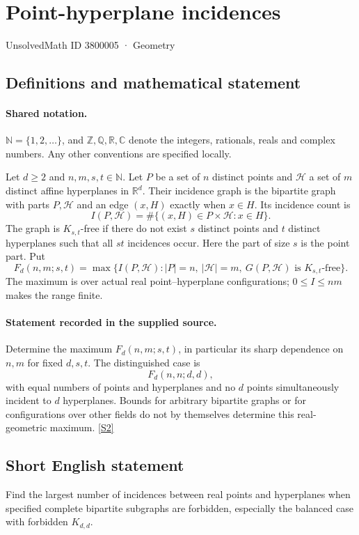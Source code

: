 \documentclass[11pt]{article}
\newcommand{\sref}[2]{\hyperlink{source:#1:#2}{[S#2]}}
\begin{document}
\setcounter{section}{3800004}
\section{Point-hyperplane incidences}\label{3800005}
{\small\sffamily UnsolvedMath ID 3800005 · Geometry}
\subsection{Definitions and mathematical statement}

\paragraph{Shared notation.}$\mathbb N=\{1,2,\ldots\}$, and $\mathbb Z,\mathbb Q,\mathbb R,\mathbb C$ denote the integers, rationals, reals and complex numbers. Any other conventions are specified locally.


Let $d\ge2$ and $n,m,s,t\in\mathbb N$. Let $P$ be a set of $n$ distinct points and $\mathcal H$ a set of $m$ distinct affine hyperplanes in $\mathbb R^d$. Their incidence graph is the bipartite graph with parts $P,\mathcal H$ and an edge $(x,H)$ exactly when $x\in H$. Its incidence count is
\[
 I(P,\mathcal H)=\#\{(x,H)\in P\times\mathcal H:x\in H\}.
\]
The graph is $K_{s,t}$-free if there do not exist $s$ distinct points and $t$ distinct hyperplanes such that all $st$ incidences occur. Here the part of size $s$ is the point part. Put
\[
 F_d(n,m;s,t)=\max\{I(P,\mathcal H):|P|=n,\ |\mathcal H|=m,\ G(P,\mathcal H)\text{ is }K_{s,t}\text{-free}\}.
\]
The maximum is over actual real point--hyperplane configurations; $0\le I\le nm$ makes the range finite.
\paragraph{Statement recorded in the supplied source.}
Determine the maximum $F_d(n,m;s,t)$, in particular its sharp dependence on $n,m$ for fixed $d,s,t$. The distinguished case is
\[
 F_d(n,n;d,d),
\]
with equal numbers of points and hyperplanes and no $d$ points simultaneously incident to $d$ hyperplanes. Bounds for arbitrary bipartite graphs or for configurations over other fields do not by themselves determine this real-geometric maximum. \sref{3800005}{2}
\subsection{Short English statement}
Find the largest number of incidences between real points and hyperplanes when specified complete bipartite subgraphs are forbidden, especially the balanced case with forbidden $K_{d,d}$.
\end{document}
